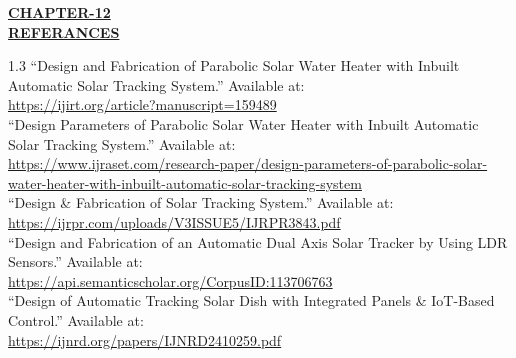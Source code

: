 \begin{center}
  {\fontsize{15}{18}\selectfont \bfseries \textcolor{red!80!black}{\underline{CHAPTER-12}}}\\[2mm]
  {\fontsize{16}{20}\selectfont \bfseries \textcolor{red!80!black}{\underline{REFERANCES}}}\\[6mm]
\end{center}

\noindent
\begin{spacing}{1.3}
{\fontsize{10.2}{15}\selectfont
``Design and Fabrication of Parabolic Solar Water Heater with Inbuilt Automatic Solar Tracking System.'' Available at:\\[1mm]
\url{https://ijirt.org/article?manuscript=159489}\\[4mm]
``Design Parameters of Parabolic Solar Water Heater with Inbuilt Automatic Solar Tracking System.'' Available at:\\[1mm]
\url{https://www.ijraset.com/research-paper/design-parameters-of-parabolic-solar-water-heater-with-inbuilt-automatic-solar-tracking-system}\\[4mm]
``Design \& Fabrication of Solar Tracking System.'' Available at:\\[1mm]
\url{https://ijrpr.com/uploads/V3ISSUE5/IJRPR3843.pdf}\\[4mm]
``Design and Fabrication of an Automatic Dual Axis Solar Tracker by Using LDR Sensors.'' Available at:\\[1mm]
\url{https://api.semanticscholar.org/CorpusID:113706763}\\[4mm]
``Design of Automatic Tracking Solar Dish with Integrated Panels \& IoT-Based Control.'' Available at:\\[1mm]
\url{https://ijnrd.org/papers/IJNRD2410259.pdf}
}
\end{spacing}
\clearpage
